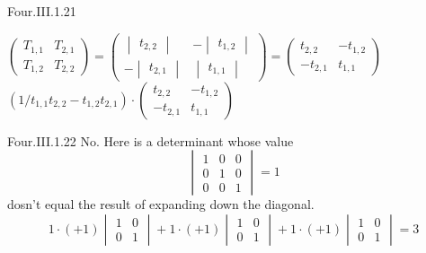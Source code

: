 \begin{ans}{Four.III.1.21}
      \begin{exparts}
        \partsitem
          $\begin{pmatrix}
             T_{1,1}  &T_{2,1}  \\
             T_{1,2}  &T_{2,2}
            \end{pmatrix}
            =\begin{pmatrix}
            \begin{vmatrix}
              t_{2,2}
            \end{vmatrix}
           &-\begin{vmatrix}
               t_{1,2}
             \end{vmatrix}       \\
           -\begin{vmatrix}
               t_{2,1}
            \end{vmatrix}
           &\begin{vmatrix}
              t_{1,1}
            \end{vmatrix}
          \end{pmatrix}
          =\begin{pmatrix}
             t_{2,2}  &-t_{1,2}  \\
            -t_{2,1} &t_{1,1}
           \end{pmatrix}$
        \partsitem
          $(1/t_{1,1}t_{2,2}-t_{1,2}t_{2,1})\cdot
          \begin{pmatrix}
             t_{2,2}  &-t_{1,2}  \\
            -t_{2,1} &t_{1,1}
           \end{pmatrix}$
      \end{exparts}
    
\end{ans}
\begin{ans}{Four.III.1.22}
      No.
      Here is a determinant whose value
      \begin{equation*}
        \begin{vmatrix}
          1  &0  &0  \\
          0  &1  &0  \\
          0  &0  &1
        \end{vmatrix}=1
      \end{equation*}
      dosn't equal the result of
      expanding down the diagonal.
      \begin{equation*}
        1\cdot (+1)\begin{vmatrix}
               1  &0  \\
               0  &1
             \end{vmatrix}
       +1\cdot (+1)\begin{vmatrix}
               1  &0  \\
               0  &1
             \end{vmatrix}
       +1\cdot (+1)\begin{vmatrix}
               1  &0  \\
               0  &1
             \end{vmatrix}=3
      \end{equation*}
    
\end{ans}

